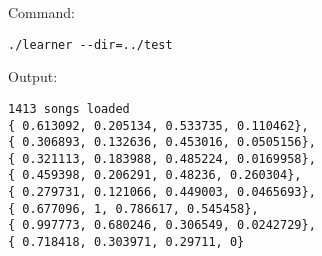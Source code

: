 Command:
\begin{verbatim}
./learner --dir=../test
\end{verbatim}
Output:
\begin{verbatim}
1413 songs loaded
{ 0.613092, 0.205134, 0.533735, 0.110462}, 
{ 0.306893, 0.132636, 0.453016, 0.0505156}, 
{ 0.321113, 0.183988, 0.485224, 0.0169958}, 
{ 0.459398, 0.206291, 0.48236, 0.260304}, 
{ 0.279731, 0.121066, 0.449003, 0.0465693}, 
{ 0.677096, 1, 0.786617, 0.545458}, 
{ 0.997773, 0.680246, 0.306549, 0.0242729}, 
{ 0.718418, 0.303971, 0.29711, 0}
\end{verbatim}
